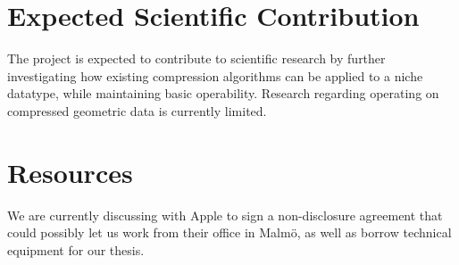 \documentclass{article}
\begin{document}
\section{Expected Scientific Contribution}
The project is expected to contribute to scientific research by further investigating how existing compression algorithms can be applied to a niche datatype, while maintaining basic operability. Research regarding operating on compressed geometric data is currently limited.

\section{Resources}
We are currently discussing with Apple to sign a non-disclosure agreement that could possibly let us work from their office in Malmö, as well as borrow technical equipment for our thesis.
\end{document}
